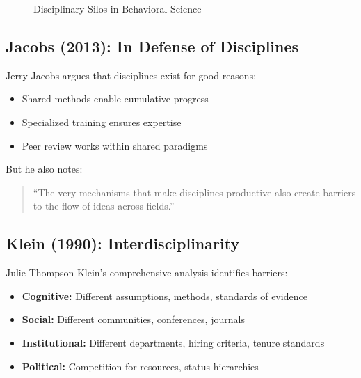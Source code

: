 \begin{figure}[htbp]
\centering
{}
\caption{Disciplinary Silos in Behavioral Science}
\label{fig:silos}
\end{figure}

\subsection{Jacobs (2013): In Defense of Disciplines}

Jerry Jacobs argues that disciplines exist for good reasons:
\begin{itemize}
\item Shared methods enable cumulative progress
\item Specialized training ensures expertise
\item Peer review works within shared paradigms
\end{itemize}

But he also notes:
\begin{quote}
``The very mechanisms that make disciplines productive also create barriers to the flow of ideas across fields.''
\end{quote}

\subsection{Klein (1990): Interdisciplinarity}

Julie Thompson Klein's comprehensive analysis identifies barriers:
\begin{itemize}
\item \textbf{Cognitive:} Different assumptions, methods, standards of evidence
\item \textbf{Social:} Different communities, conferences, journals
\item \textbf{Institutional:} Different departments, hiring criteria, tenure standards
\item \textbf{Political:} Competition for resources, status hierarchies
\end{itemize}

